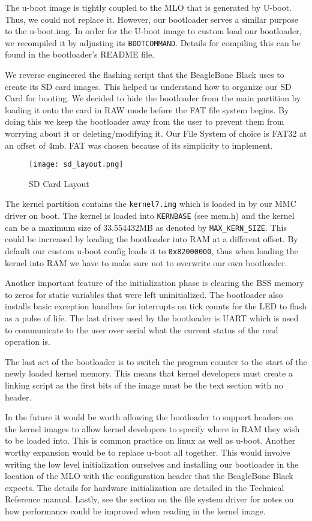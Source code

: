 \documentclass[12pt]{article}
\newcommand{\code}[1]{\colorbox{codegray}{\texttt{\footnotesize{#1}}}}
\begin{document}
The u-boot image is tightly coupled to the MLO that is generated by U-boot. Thus,
we could not replace it. However, our bootloader serves a similar purpose to the
u-boot.img. In order for the U-boot image to custom load our bootloader, we
recompiled it by adjusting its \code{BOOTCOMMAND}. Details for compiling this
can be found in the bootloader's README file.

We reverse engineered the flashing script that the BeagleBone Black uses to
create its SD card images. This helped us understand how to organize our
SD Card for booting. We decided to hide the bootloader from the main partition
by loading it onto the card in RAW mode before the FAT file system begins.
By doing this we keep the bootloader away from the user to prevent them from
worrying about it or deleting/modifying it. Our File System of choice is
FAT32 at an offset of 4mb. FAT was chosen because of its simplicity to implement.

\begin{figure}[!htbp]
	\centering
	\texttt{[image: sd\_layout.png]}
	\caption{SD Card Layout}
	\label{fig_sd}
\end{figure}

The kernel partition contains the \code{kernel7.img} which is loaded in by
our MMC driver on boot. The kernel is loaded into \code{KERNBASE} (see
mem.h) and the kernel can be a maximum size of 33.554432MB as denoted by
\code{MAX\_KERN\_SIZE}.  This could be increased by loading the bootloader
into RAM at a different offset.  By default our custom u-boot config loads
it to \code{0x82000000}, thus when loading the kernel into RAM we have to
make sure not to overwrite our own bootloader.

Another important feature of the initialization phase is clearing the BSS
memory to zeros for static variables that were left uninitialized. The
bootloader also installs basic exception handlers for interrupts on tick
counts for the LED to flash as a pulse of life. The last driver used by the
bootloader is UART which is used to communicate to the user over serial
what the current status of the read operation is.

The last act of the bootloader is to switch the program counter to the
start of the newly loaded kernel memory. This means that kernel developers
must create a linking script as the first bits of the image must be the
text section with no header.

In the future it would be worth allowing the bootloader to support
headers on the kernel images to allow kernel developers to specify
where in RAM they wish to be loaded into. This is common practice on
linux as well as u-boot. Another worthy expansion would be to replace
u-boot all together. This would involve writing the low level
initialization ourselves and installing our bootloader in the location
of the MLO with the configuration header that the BeagleBone Black
expects. The details for hardware initialization are detailed in the
Technical Reference manual. Lastly, see the section on the file system
driver for notes on how performance could be improved when reading in
the kernel image.
\end{document}
